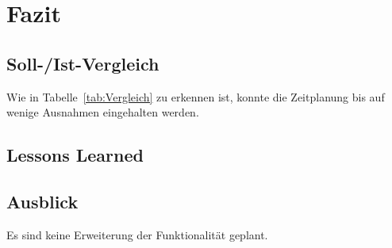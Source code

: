 \section{Fazit} 
\label{sec:Fazit}

\subsection{Soll-/Ist-Vergleich}
\label{sec:SollIstVergleich}

Wie in Tabelle~\ref{tab:Vergleich} zu erkennen ist, konnte die Zeitplanung bis auf wenige Ausnahmen eingehalten werden.


\subsection{Lessons Learned}
\label{sec:LessonsLearned}



\subsection{Ausblick}
\label{sec:Ausblick}

Es sind keine Erweiterung der Funktionalität geplant.

